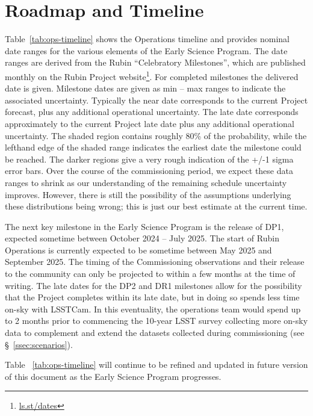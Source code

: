 \section{Roadmap and Timeline} \label{sec:timeline}

Table~\ref{tab:ops-timeline} shows the Operations timeline and provides nominal date ranges for the various elements of the Early Science Program.
The date ranges are derived from the Rubin ``Celebratory Milestones'', which are  published monthly on the Rubin Project website\footnote{\url{ls.st/dates}}. 
For completed milestones the delivered date is given. 
Milestone dates are given as min -- max ranges to indicate the associated uncertainty. 
Typically the near date corresponds to the current Project forecast, plus any additional operational uncertainty.
The late date corresponds approximately to the current Project late date plus any additional operational uncertainty.
The shaded region contains roughly 80\% of the probability, while the lefthand edge of the shaded range indicates the earliest date the milestone could be reached. 
The darker regions give a very rough indication of the +/-1 sigma error bars.
Over the course of the commissioning period, we expect these data ranges to shrink as our understanding of the remaining schedule uncertainty improves. 
However, there is still the possibility of the assumptions underlying these distributions being wrong; this is just our best estimate at the current time.



The next key milestone in the Early Science Program is the release of DP1, expected sometime between October 2024 -- July 2025.
The  start of Rubin Operations is currently expected to be sometime between May 2025 and September 2025.
The timing of the Commissioning observations and their release to the community can only be projected to within a few months at the time of writing.
The late dates for the DP2 and DR1 milestones allow for the possibility that the Project completes within its late date, but in doing so spends less time on-sky with LSSTCam.
In this eventuality, the operations team would spend up to 2 months prior to commencing the 10-year LSST survey collecting more on-sky data to complement and extend the datasets collected during commissioning (see \S~\ref{ssec:scenarios}). 

Table ~\ref{tab:ops-timeline} will continue to be refined and updated in future version of this document as the Early Science Program progresses.